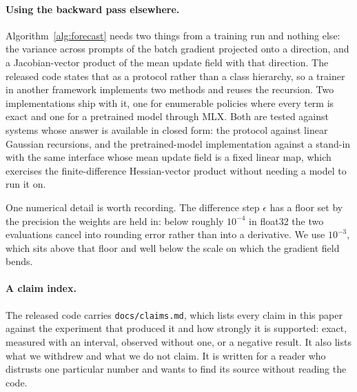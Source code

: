 \paragraph{Using the backward pass elsewhere.} Algorithm~\ref{alg:forecast} needs two things from
a training run and nothing else: the variance across prompts of the batch gradient projected onto a
direction, and a Jacobian-vector product of the mean update field with that direction. The released
code states that as a protocol rather than a class hierarchy, so a trainer in another framework
implements two methods and reuses the recursion. Two implementations ship with it, one for
enumerable policies where every term is exact and one for a pretrained model through MLX. Both are
tested against systems whose answer is available in closed form: the protocol against linear
Gaussian recursions, and the pretrained-model implementation against a stand-in with the same
interface whose mean update field is a fixed linear map, which exercises the finite-difference
Hessian-vector product without needing a model to run it on.

One numerical detail is worth recording. The difference step $\epsilon$ has a floor set by the
precision the weights are held in: below roughly $10^{-4}$ in float32 the two evaluations cancel
into rounding error rather than into a derivative. We use $10^{-3}$, which sits above that floor and
well below the scale on which the gradient field bends.

\paragraph{A claim index.} The released code carries \texttt{docs/claims.md}, which lists every
claim in this paper against the experiment that produced it and how strongly it is supported:
exact, measured with an interval, observed without one, or a negative result. It also lists what we
withdrew and what we do not claim. It is written for a reader who distrusts one particular number
and wants to find its source without reading the code.


